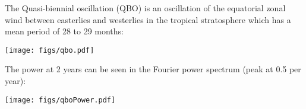 \clearpage
{}

The Quasi-biennial oscillation (QBO) is an oscillation of the equatorial zonal wind between easterlies and westerlies in the tropical stratosphere which has a mean period of 28 to 29 months:

\texttt{[image: figs/qbo.pdf]}

The power at 2 years can be seen in the Fourier power spectrum (peak at 0.5 per year):

\texttt{[image: figs/qboPower.pdf]}

